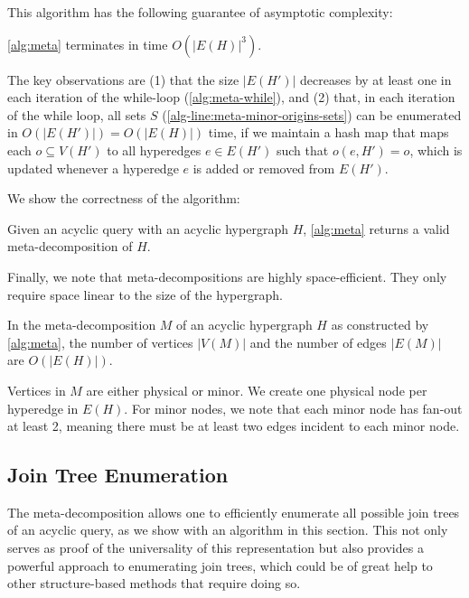 This algorithm has the following guarantee of asymptotic complexity:

\begin{theorem} \label{thm:meta-complexity}
    \cref{alg:meta} terminates in time $O(|E(H)|^3)$.
\end{theorem}

\begin{sketch}
    The key observations are (1) that the size $|E(H')|$ decreases by at least one in each iteration of the while-loop (\cref{alg:meta-while}), and (2) that, in each iteration of the while loop, all sets $S$ (\cref{alg-line:meta-minor-origins-sets}) can be enumerated in $O(|E(H')|) = O(|E(H)|)$ time, if we maintain a hash map that maps each $o \subseteq V(H')$ to all hyperedges $e \in E(H')$ such that $o(e, H') = o$, which is updated whenever a hyperedge $e$ is added or removed from $E(H')$.
\end{sketch}

We show the correctness of the algorithm:

\begin{theorem} \label{thm:meta-correct}
    Given an acyclic query with an acyclic hypergraph $H$, \cref{alg:meta} returns a valid meta-decomposition of $H$.  
\end{theorem}

Finally, we note that meta-decompositions are highly space-efficient. They only require space linear to the size of the hypergraph.

\begin{theorem} \label{thm:meta-size}
    In the meta-decomposition $M$ of an acyclic hypergraph $H$ as constructed by \cref{alg:meta}, the number of vertices $|V(M)|$ and the number of edges $|E(M)|$ are $O(|E(H)|)$.
\end{theorem}

\begin{sketch}
    Vertices in $M$ are either physical or minor. We create one physical node per hyperedge in $E(H)$. For minor nodes, we note that each minor node has fan-out at least 2, meaning there must be at least two edges incident to each minor node.
\end{sketch}

\subsection{Join Tree Enumeration}
\label{sec:enum}

The meta-decomposition allows one to efficiently enumerate all possible join trees of an acyclic query, as we show with an algorithm in this section. This not only serves as proof of the universality of this representation but also provides a powerful approach to enumerating join trees, which could be of great help to other structure-based methods that require doing so.


